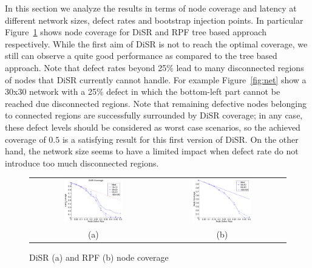 In this section we analyze the results in terms of node
coverage and latency at different network sizes, defect rates and
bootstrap injection points.  In particular
Figure~\ref{fig:results_coverage} shows
node coverage for DiSR and RPF tree based approach respectively. While
the first aim of DiSR is not to reach the optimal coverage, we still
can observe a quite good performance as compared to the tree based
approach. Note that defect rates beyond 25\% lead to many disconnected
regions of nodes that DiSR currently cannot handle.
For example Figure~\ref{fig:net} show a 30x30 network with a 25\%
defect in which the bottom-left part cannot be reached due
disconnected regions. Note that remaining defective nodes belonging to
connected regions are successfully surrounded by DiSR coverage; in any
case, these defect levels should be considered as worst case scenarios, so the
achieved coverage of $0.5$ is a satisfying result for this first
version of DiSR. On the other hand, the network size seems to have a
limited impact when defect rate do not introduce too much disconnected
regions. 
\begin{figure}
\centering
\begin{tabular}{cc}
\includegraphics[width=0.48\textwidth]{pictures/set1.eps} & 
\includegraphics[width=0.48\textwidth]{pictures/coverage.eps} \\
(a) & (b) 
\end{tabular}
\caption{DiSR (a) and RPF (b) node coverage}
\label{fig:results_coverage}
\end{figure}

